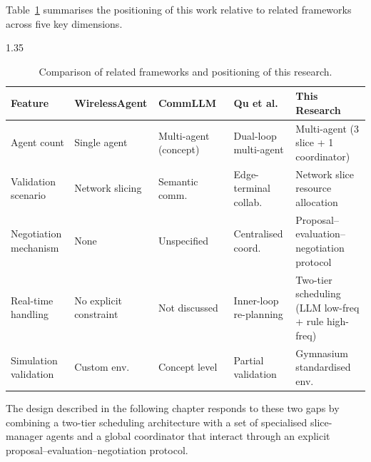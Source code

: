 Table~\ref{table:comparison} summarises the positioning of this work relative to related frameworks across five key dimensions.

\begin{table}[h]
  \centering
  \begin{spacing}{1.35}
  \caption{Comparison of related frameworks and positioning of this research.}\vspace{0.7em}
  \label{table:comparison}
  \footnotesize
    \begin{tabular}{|p{2.6cm}|p{2.3cm}|p{2.3cm}|p{2.3cm}|p{3.5cm}|}
    \hline
    \textbf{Feature} & \textbf{WirelessAgent}\newline\cite{tong2025wirelessagent} & \textbf{CommLLM}~\cite{jiang2024commllm} & \textbf{Qu et al.}~\cite{qu2025dualloop} & \textbf{This Research} \\
    \hline
    Agent count & Single agent & Multi-agent (concept) & Dual-loop multi-agent & Multi-agent (3 slice + 1 coordinator) \\
    \hline
    Validation scenario & Network slicing & Semantic comm. & Edge-terminal collab. & Network slice resource allocation \\
    \hline
    Negotiation mechanism & None & Unspecified & Centralised coord. & Proposal--evaluation--negotiation protocol \\
    \hline
    Real-time handling & No explicit constraint & Not discussed & Inner-loop re-planning & Two-tier scheduling (LLM low-freq + rule high-freq) \\
    \hline
    Simulation validation & Custom env. & Concept level & Partial validation & Gymnasium standardised env. \\
    \hline
    \end{tabular}
  \end{spacing}
\end{table}

The design described in the following chapter responds to these two gaps by combining a two-tier scheduling architecture with a set of specialised slice-manager agents and a global coordinator that interact through an explicit proposal--evaluation--negotiation protocol.

%
%
